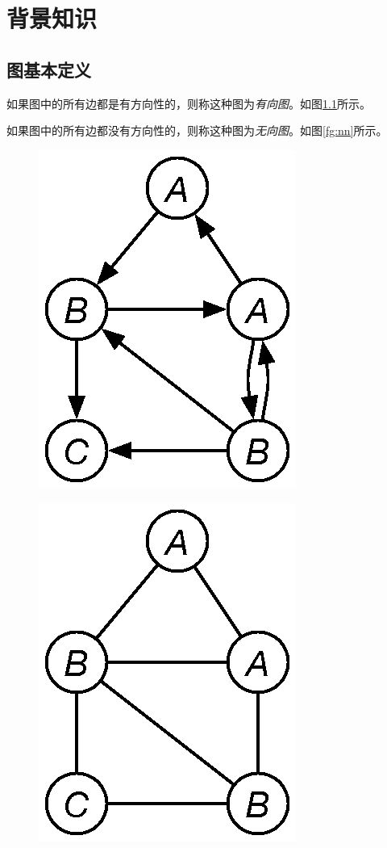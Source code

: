 \documentclass{XDBAthesis}
\begin{document}
\else
\fi
\chapter{背景知识}
\label{chap:background}
\section{图基本定义}
\begin{defn}[有向图]
    如果图中的所有边都是有方向性的，则称这种图为\emph{有向图}。如图\ref{fg:dd}所示。
\end{defn}
\begin{defn}[无向图]
    如果图中的所有边都没有方向性的，则称这种图为\emph{无向图}。如图\ref{fg:nn}所示。

\end{defn}
\begin{figure}[htp]
    \centering
    \begin{minipage}{0.5\textwidth}
        \centering
        \includegraphics[scale=.8]{../omnigraffle/Dgraph}
        \label{fg:dd}
    \end{minipage}%
    \begin{minipage}{0.5\textwidth}
        \centering
        \includegraphics[scale=.8]{../omnigraffle/ngraph}

\end{minipage}
\end{figure}
\end{document}
